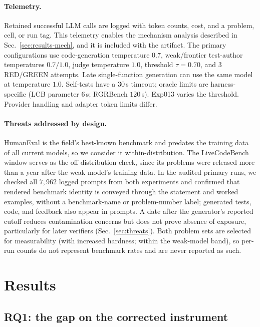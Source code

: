 \paragraph{Telemetry.} Retained successful LLM calls are logged with token counts, cost, and a problem, cell,
or run tag. This telemetry enables the mechanism analysis described in
Sec.~\ref{sec:results-mech}, and it is included with the artifact. The primary configurations use code-generation temperature $0.7$,
weak/frontier test-author temperatures $0.7/1.0$, judge temperature $1.0$,
threshold $\tau{=}0.70$, and $3$ RED/GREEN attempts. Late single-function generation
can use the same model at temperature $1.0$. Self-tests have a $30$\,s timeout;
oracle limits are harness-specific (LCB parameter $6$\,s; RGRBench $120$\,s).
Exp013 varies the threshold. Provider handling and adapter token limits differ.



\paragraph{Threats addressed by design.} HumanEval is the field's best-known benchmark and
predates the training data of all current models, so we consider it within-distribution. The
LiveCodeBench window serves as the off-distribution check, since its problems were released more
than a year after the weak model's training data. In the audited primary runs, we checked all $7{,}962$ logged prompts from both experiments and confirmed that rendered
benchmark identity is conveyed through the statement and worked examples, without a
benchmark-name or problem-number label; generated tests, code, and feedback also appear in prompts. A date after the generator's reported cutoff reduces contamination concerns but does not
prove absence of exposure, particularly for later verifiers (Sec.~\ref{sec:threats}). Both problem sets are selected for measurability (with increased hardness; within the
weak-model band), so per-run counts do not represent benchmark rates and are never reported as
such.

\section{Results}
\label{sec:results}

\subsection{RQ1: the gap on the corrected instrument}
\label{sec:results-gap}

